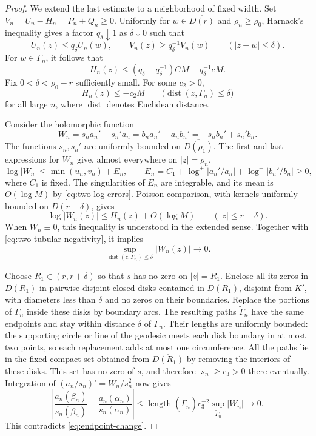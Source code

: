 \documentclass[12pt,letterpaper,reqno]{amsart}
\theoremstyle{definition}
\numberwithin{equation}{section}
\begin{document}
\begin{proof}
		We extend the last estimate to a neighborhood of fixed width.
		Set $V_n=U_n-H_n=P_n+Q_n\ge0$. Uniformly for
		$w\in\overline{D(r)}$ and $\rho_n\ge\rho_0$, Harnack's inequality
		gives a factor $q_\delta\downarrow1$ as $\delta\downarrow0$ such that
		\[
		U_n(z)\le q_\delta U_n(w),\qquad
		V_n(z)\ge q_\delta^{-1}V_n(w)
		\qquad(|z-w|\le\delta).
		\]
		For $w\in\Gamma_n$, it follows that
		\[
		H_n(z)
		\le(q_\delta-q_\delta^{-1})CM-q_\delta^{-1}cM.
		\]
		Fix $0<\delta<\rho_0-r$ sufficiently small. For some $c_2>0$,
		\begin{equation}\label{eq:two-tubular-negativity}
			H_n(z)\le-c_2M
			\qquad\bigl(\operatorname{dist}(z,\Gamma_n)\le\delta\bigr)
		\end{equation}
		for all large $n$, where $\operatorname{dist}$ denotes Euclidean
		distance.
		
		Consider the holomorphic function
		\[
		W_n=s_na_n'-s_n'a_n
		=b_na_n'-a_nb_n'
		=-s_nb_n'+s_n'b_n.
		\]
		The functions $s_n,s_n'$ are uniformly bounded on
		$\overline{D(\rho_1)}$. The first and last expressions for $W_n$
		give, almost everywhere on $|z|=\rho_n$,
		\[
		\log|W_n|\le\min(u_n,v_n)+E_n,
		\qquad
		E_n=C_1+\log^+|a_n'/a_n|+\log^+|b_n'/b_n|\ge0,
		\]
		where $C_1$ is fixed. The singularities of $E_n$ are integrable,
		and its mean is $O(\log M)$ by \eqref{eq:two-log-errors}.
		Poisson comparison, with kernels uniformly bounded on
		$\overline{D(r+\delta)}$, gives
		\[
		\log|W_n(z)|\le H_n(z)+O(\log M)
		\qquad(|z|\le r+\delta).
		\]
		When $W_n\equiv0$, this inequality is understood in the extended
		sense. Together with \eqref{eq:two-tubular-negativity}, it implies
		\begin{equation*}
			\sup_{\operatorname{dist}(z,\Gamma_n)\le\delta}|W_n(z)|
			\longrightarrow0.
		\end{equation*}
		
		Choose $R_1\in(r,r+\delta)$ so that $s$ has no zero on $|z|=R_1$.
		Enclose all its zeros in $D(R_1)$ in pairwise disjoint closed disks
		contained in $D(R_1)$, disjoint from $K'$, with diameters less than
		$\delta$ and no zeros on their boundaries. Replace the portions of
		$\Gamma_n$ inside these disks by boundary arcs. The resulting paths
		$\widetilde\Gamma_n$ have the same endpoints and stay within distance
		$\delta$ of $\Gamma_n$. Their lengths are uniformly bounded: the
		supporting circle or line of the geodesic meets each disk boundary
		in at most two points, so each replacement adds at most one
		circumference. All the paths lie in the fixed compact set obtained
		from $\overline{D(R_1)}$ by removing the interiors of these disks.
		This set has no zero of $s$, and therefore $|s_n|\ge c_3>0$ there
		eventually. Integration of $(a_n/s_n)'=W_n/s_n^2$ now gives
		\[
		\left|
		\frac{a_n(\beta_n)}{s_n(\beta_n)}
		-\frac{a_n(\alpha_n)}{s_n(\alpha_n)}
		\right|
		\le
		\operatorname{length}(\widetilde\Gamma_n)c_3^{-2}
		\sup_{\widetilde\Gamma_n}|W_n|
		\longrightarrow0.
		\]
		This contradicts \eqref{eq:endpoint-change}.
	\end{proof}
	
\end{document}
